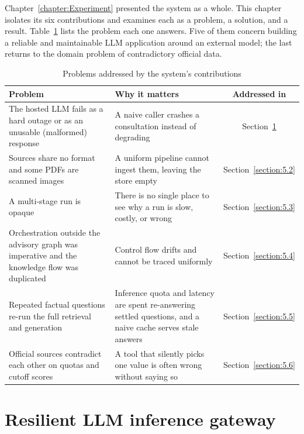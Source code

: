 \documentclass[../main.tex]{subfiles}
\begin{document}

Chapter~\ref{chapter:Experiment} presented the system as a whole.
This chapter isolates its six contributions and examines each as a problem, a solution, and a result.
Table~\ref{table:problems} lists the problem each one answers.
Five of them concern building a reliable and maintainable \gls{LLM} application around an external model; the last returns to the domain problem of contradictory official data.

\begin{table}[H]
    \centering
    \caption{Problems addressed by the system's contributions}
    \label{table:problems}
    {\footnotesize
    \setlength{\tabcolsep}{5pt}
    \begin{tabular}{|p{4.5cm}|p{6.3cm}|c|}
        \hline
        \textbf{Problem} & \textbf{Why it matters} & \textbf{Addressed in} \\
        \hline
        The hosted \gls{LLM} fails as a hard outage or as an unusable (malformed) response & A naive caller crashes a consultation instead of degrading & Section~\ref{section:5.1} \\
        \hline
        Sources share no format and some \gls{PDF}s are scanned images & A uniform pipeline cannot ingest them, leaving the store empty & Section~\ref{section:5.2} \\
        \hline
        A multi-stage run is opaque & There is no single place to see why a run is slow, costly, or wrong & Section~\ref{section:5.3} \\
        \hline
        Orchestration outside the advisory graph was imperative and the knowledge flow was duplicated & Control flow drifts and cannot be traced uniformly & Section~\ref{section:5.4} \\
        \hline
        Repeated factual questions re-run the full retrieval and generation & Inference quota and latency are spent re-answering settled questions, and a naive cache serves stale answers & Section~\ref{section:5.5} \\
        \hline
        Official sources contradict each other on quotas and cutoff scores & A tool that silently picks one value is often wrong without saying so & Section~\ref{section:5.6} \\
        \hline
    \end{tabular}}
\end{table}

\section{Resilient LLM inference gateway}
\label{section:5.1}
\end{document}
